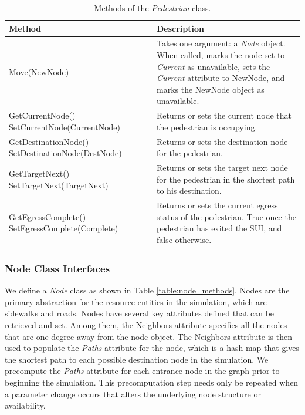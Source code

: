 \documentclass[12pt]{article}
\begin{document}
\def\arraystretch{1.5}
\begin{table}
  \centering
    \begin{tabular}{p{0.5\linewidth}p{0.5\linewidth}}
     \hline
     Method & Description \\
     \hline
     Move(NewNode) & Takes one argument: a \textit{Node} object. When called,
                     marks the node set to \textit{Current} as unavailable,
                     sets the \textit{Current} attribute to NewNode,
                     and marks the NewNode object as unavailable. \\
     GetCurrentNode() \newline SetCurrentNode(CurrentNode) & Returns or sets
                        the current node that the pedestrian is occupying. \\
     GetDestinationNode() \newline SetDestinationNode(DestNode) & Returns or
                        sets the destination node for the pedestrian. \\
     GetTargetNext() \newline SetTargetNext(TargetNext) & Returns or
                       sets the target next node for the pedestrian in the
                       shortest path to his destination. \\
     GetEgressComplete() \newline SetEgressComplete(Complete) & Returns or
                        sets the current egress status of the pedestrian. True
                        once the pedestrian has exited the SUI, and false
                        otherwise. \\
     \hline
    \end{tabular}
    \caption{Methods of the \textit{Pedestrian} class.}
  \label{table:pedestrian_methods}
\end{table}

\subsubsection{Node Class Interfaces}
We define a \textit{Node} class as shown in Table \ref{table:node_methods}.
Nodes are the primary abstraction for the resource entities in the simulation,
which are sidewalks and roads. Nodes have several key attributes defined that
can be retrieved and set. Among them, the Neighbors attribute specifies all the
nodes that are one degree away from the node object. The Neighbors attribute is
then used to populate the \textit{Paths} attribute for the node, which is a hash map
that gives the shortest path to each possible destination node
in the simulation. We precompute the \textit{Paths} attribute for each entrance
node in the graph prior to beginning the simulation. This precomputation step
needs only be repeated when a parameter change occurs that alters the underlying
node structure or availability.
\end{document}
